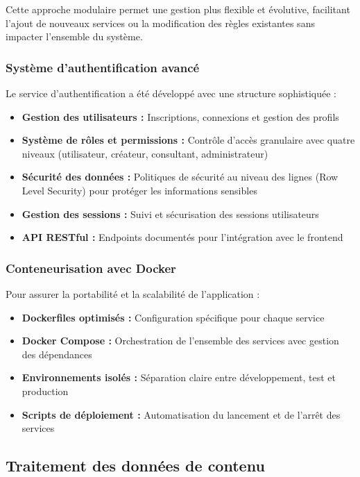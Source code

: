 Cette approche modulaire permet une gestion plus flexible et évolutive, facilitant l'ajout de nouveaux services ou la modification des règles existantes sans impacter l'ensemble du système.

\subsubsection{Système d'authentification avancé}

Le service d'authentification a été développé avec une structure sophistiquée :

\begin{itemize}
  \item \textbf{Gestion des utilisateurs :} Inscriptions, connexions et gestion des profils
  \item \textbf{Système de rôles et permissions :} Contrôle d'accès granulaire avec quatre niveaux (utilisateur, créateur, consultant, administrateur)
  \item \textbf{Sécurité des données :} Politiques de sécurité au niveau des lignes (Row Level Security) pour protéger les informations sensibles
  \item \textbf{Gestion des sessions :} Suivi et sécurisation des sessions utilisateurs
  \item \textbf{API RESTful :} Endpoints documentés pour l'intégration avec le frontend
\end{itemize}

\subsubsection{Conteneurisation avec Docker}

Pour assurer la portabilité et la scalabilité de l'application :

\begin{itemize}
  \item \textbf{Dockerfiles optimisés :} Configuration spécifique pour chaque service
  \item \textbf{Docker Compose :} Orchestration de l'ensemble des services avec gestion des dépendances
  \item \textbf{Environnements isolés :} Séparation claire entre développement, test et production
  \item \textbf{Scripts de déploiement :} Automatisation du lancement et de l'arrêt des services
\end{itemize}

\subsection{Traitement des données de contenu}

